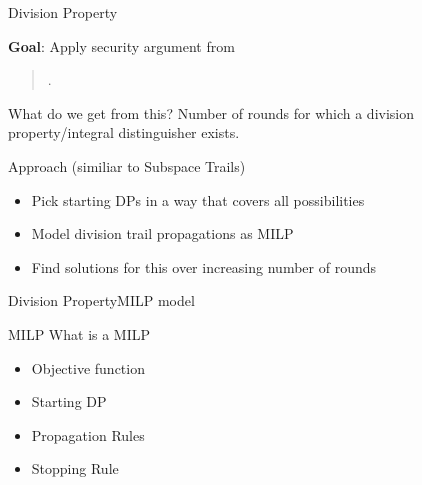 \begin{frame}{Division Property}
    \begin{block}{\textbf{Goal}: Apply security argument from}
    \begin{quote}
        .
    \end{quote}
    \end{block}
    \begin{exampleblock}{What do we get from this?}
        \centering
        Number of rounds for which a division property/integral distinguisher exists.
    \end{exampleblock}
    \begin{block}{Approach (similiar to Subspace Trails)}
        \begin{itemize}
            \item Pick starting DPs in a way that covers all possibilities
            \item Model division trail propagations as MILP
            \item Find solutions for this over increasing number of rounds
        \end{itemize}
    \end{block}
\end{frame}

\begin{frame}{Division Property}{MILP model}
    \begin{block}{MILP}
        What is a MILP
    \end{block}
    \begin{itemize}
        \item Objective function
        \item Starting DP
        \item Propagation Rules
        \item Stopping Rule
    \end{itemize}
\end{frame}
